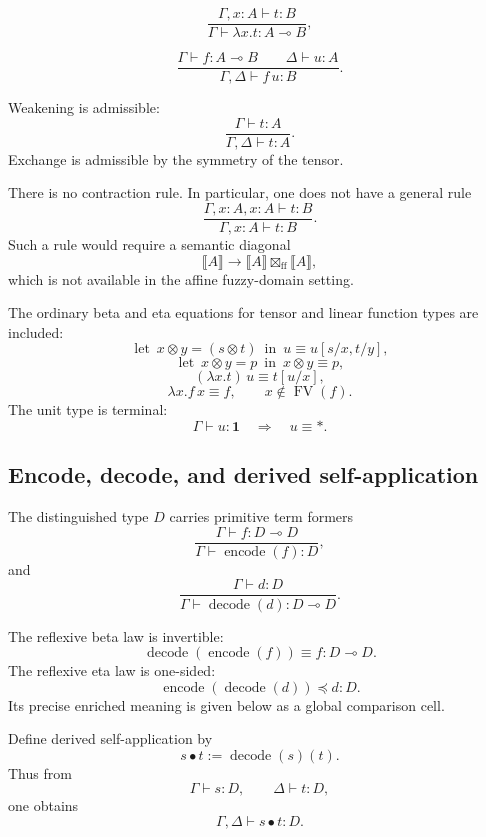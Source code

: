 \[
    \frac{\Gamma,x:A\vdash t:B}
         {\Gamma\vdash \lambda x.t:A\multimap B},
\]

\[
    \frac{\Gamma\vdash f:A\multimap B
          \qquad
          \Delta\vdash u:A}
         {\Gamma,\Delta\vdash f\,u:B}.
\]

Weakening is admissible:
\[
    \frac{\Gamma\vdash t:A}
         {\Gamma,\Delta\vdash t:A}.
\]
Exchange is admissible by the symmetry of the tensor.

There is no contraction rule.  In particular, one does not have a general rule
\[
    \frac{\Gamma,x:A,x:A\vdash t:B}
         {\Gamma,x:A\vdash t:B}.
\]
Such a rule would require a semantic diagonal
\[
    \llbracket A\rrbracket
    \longrightarrow
    \llbracket A\rrbracket
    \boxtimes_{\mathrm{ff}}
    \llbracket A\rrbracket,
\]
which is not available in the affine fuzzy-domain setting.

The ordinary beta and eta equations for tensor and linear function types are
included:
\[
    \operatorname{let}\ x\otimes y=(s\otimes t)\ \operatorname{in}\ u
    \equiv
    u[s/x,t/y],
\]
\[
    \operatorname{let}\ x\otimes y=p\ \operatorname{in}\ x\otimes y
    \equiv
    p,
\]
\[
    (\lambda x.t)\,u
    \equiv
    t[u/x],
\]
\[
    \lambda x.f\,x
    \equiv
    f,
    \qquad x\notin \operatorname{FV}(f).
\]
The unit type is terminal:
\[
    \Gamma\vdash u:\mathbf 1
    \quad\Longrightarrow\quad
    u\equiv *.
\]

\subsection{Encode, decode, and derived self-application}
\label{subsec:encode-decode-derived-self-application-cosmos}

The distinguished type \(D\) carries primitive term formers
\[
    \frac{\Gamma\vdash f:D\multimap D}
         {\Gamma\vdash \operatorname{encode}(f):D},
\]
and
\[
    \frac{\Gamma\vdash d:D}
         {\Gamma\vdash \operatorname{decode}(d):D\multimap D}.
\]

The reflexive beta law is invertible:
\[
    \operatorname{decode}(\operatorname{encode}(f))
    \equiv
    f
    :
    D\multimap D.
\]
The reflexive eta law is one-sided:
\[
    \operatorname{encode}(\operatorname{decode}(d))
    \preceq
    d
    :
    D.
\]
Its precise enriched meaning is given below as a global comparison cell.

Define derived self-application by
\[
    s\bullet t
    :=
    \operatorname{decode}(s)(t).
\]
Thus from
\[
    \Gamma\vdash s:D,
    \qquad
    \Delta\vdash t:D,
\]
one obtains
\[
    \Gamma,\Delta\vdash s\bullet t:D.
\]


